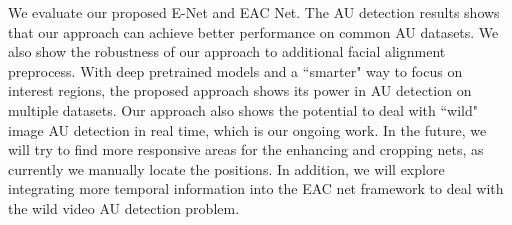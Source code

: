 \documentclass[a4paper, 10pt, conference]{ieeeconf}      %
\begin{document}
We evaluate our proposed E-Net and EAC Net. The AU detection results shows that our approach can achieve better performance on common AU datasets. We also show the robustness of our approach to additional facial alignment preprocess. With deep pretrained models and a ``smarter" way to focus on interest regions, the proposed approach shows its power in AU detection on multiple datasets. Our approach also shows the potential to deal with ``wild" image AU detection in real time, which is our ongoing work.
In the future, we will try to find more responsive areas for the enhancing and cropping nets, as currently we manually locate the positions. In addition, we will explore integrating more temporal information into the EAC net framework to deal with the wild video AU detection problem.
\end{document}
